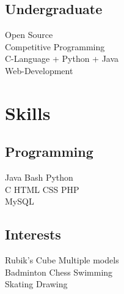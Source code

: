 \documentclass[]{deedy-resume-openfont}
\begin{document}
\begin{minipage}[t]{0.33\textwidth}

\sectionsep

\subsection{Undergraduate}
Open Source \\
Competitive Programming \\
C-Language + Python + Java  \\
Web-Development\\
\sectionsep


\section{Skills}
\subsection{Programming}
Java \textbullet{}   Bash \textbullet{}  Python \textbullet{}  \\
C \textbullet{} HTML \textbullet{} CSS \textbullet{} PHP \textbullet{} \\
\textbullet MySQL
\sectionsep

\subsection{Interests}
Rubik's Cube Multiple models \\ \textbullet{} Badminton \textbullet{} Chess \textbullet{} Swimming \\ \textbullet{} Skating  \textbullet{} Drawing \\
\sectionsep

%
%

\end{minipage} 
\end{document}
